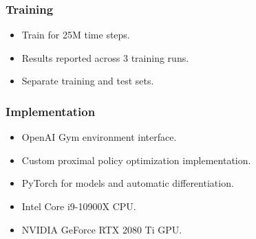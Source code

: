 \begin{frame}
    \frametitle{Training}

    \begin{itemize}
        \item Train for 25M time steps.
        \item Results reported across 3 training runs.
        \item Separate training and test sets.
    \end{itemize}
\end{frame}

\begin{frame}
    \frametitle{Implementation}

    \begin{itemize}
        \item OpenAI Gym environment interface.
        \item Custom proximal policy optimization implementation.
        \item PyTorch for models and automatic differentiation.
        \item Intel Core i9-10900X CPU.
        \item NVIDIA GeForce RTX 2080 Ti GPU.
    \end{itemize}
\end{frame}